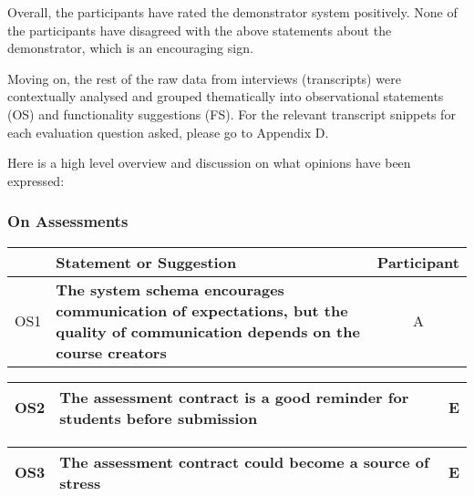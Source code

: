 Overall, the participants have rated the demonstrator system positively.
None of the participants have disagreed with the above statements about the demonstrator, 
which is an encouraging sign.

Moving on, the rest of the raw data from interviews (transcripts) were contextually analysed and grouped thematically into 
observational statements (OS) and functionality suggestions (FS).
For the relevant transcript snippets for each evaluation question asked, please go to Appendix D.

Here is a high level overview and discussion on what opinions have been expressed:

\subsubsection{On Assessments}

\begin{table}[!ht]
	\begin{tabularx}{\textwidth}{|c|X|c|}
		\hline
		& Statement or Suggestion & Participant\\
		\hline
		OS1 & \textbf{The system schema encourages communication of expectations, but the quality of communication depends on the course creators} & A                 \\
		\hline
	\end{tabularx}
\end{table}

\begin{table}[!ht]
	\begin{tabularx}{\textwidth}{|c|X|c|}
		\hline
		OS2 & \textbf{The assessment contract is a good reminder for students before submission} & E                 \\
		\hline
	\end{tabularx}
\end{table}

\begin{table}[!ht]
	\begin{tabularx}{\textwidth}{|c|X|c|}
		\hline
		OS3 & \textbf{The assessment contract could become a source of stress} & E                 \\
		\hline
	\end{tabularx}
\end{table}

